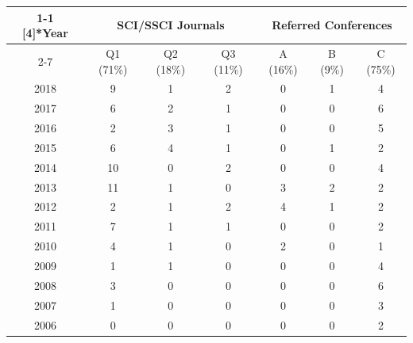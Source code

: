 \documentclass{tikzposter} %
\begin{document}
\begin{columns}
{\begin{multicols}{2}
{\begin{minipage}{\linewidth}
{		
						}		
					\end{minipage}
				}
				\vfill
				\scalebox{0.6}
				{
					\begin{minipage}{\linewidth}
						\begin{tabular}{c|c c c|c c c}
							\toprule
							\cmidrule{1-1}    \multirow{2}[4]{*}{Year} & \multicolumn{3}{c}{SCI/SSCI Journals} &\multicolumn{3}{c}{Referred Conferences} \\
							\cmidrule{2-7}          & Q1 (71\%) & Q2 (18\%) & Q3 (11\%) & A (16\%) & B (9\%) & C (75\%) \\
							\midrule
							2018  & 9     & 1     & 2     & 0     & 1     & 4 \\
							2017  & 6     & 2     & 1     & 0     & 0     & 6 \\
							2016  & 2     & 3     & 1     & 0     & 0     & 5 \\
							2015  & 6     & 4     & 1     & 0     & 1     & 2 \\
							2014  & 10    & 0     & 2     & 0     & 0     & 4 \\
							2013  & 11    & 1     & 0     & 3     & 2     & 2 \\
							2012  & 2     & 1     & 2     & 4     & 1     & 2 \\
							2011  & 7     & 1     & 1     & 0     & 0     & 2 \\
							2010  & 4     & 1     & 0     & 2     & 0     & 1 \\
							2009  & 1     & 1     & 0     & 0     & 0     & 4 \\
							2008  & 3     & 0     & 0     & 0     & 0     & 6 \\
							2007  & 1     & 0     & 0     & 0     & 0     & 3 \\
							2006  & 0     & 0     & 0     & 0     & 0     & 2 \\
							\bottomrule
						\end{tabular}
					\end{minipage}
				}	
				

\end{multicols}}
\end{columns}
\end{document}
